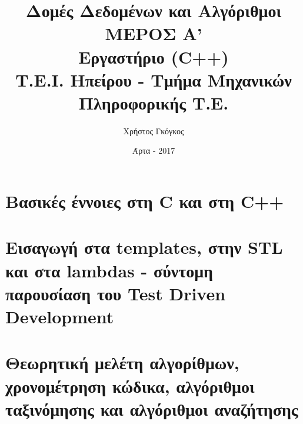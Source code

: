 \documentclass[11pt,a4paper]{book}
\title{Δομές Δεδομένων και Αλγόριθμοι \\ ΜΕΡΟΣ Α' \\ Εργαστήριο (C++)\\ Τ.Ε.Ι. Ηπείρου - Τμήμα Μηχανικών Πληροφορικής Τ.Ε.}
\author{Χρήστος Γκόγκος }
\date{Άρτα - 2017}
\begin{document}
\maketitle
\mainmatter

\chapter{Βασικές έννοιες στη C και στη C++}


\chapter{Εισαγωγή στα templates, στην STL και στα lambdas - σύντομη παρουσίαση του Test Driven Development}


\chapter{Θεωρητική μελέτη αλγορίθμων, χρονομέτρηση κώδικα, αλγόριθμοι ταξινόμησης και αλγόριθμοι αναζήτησης}

\end{document}
